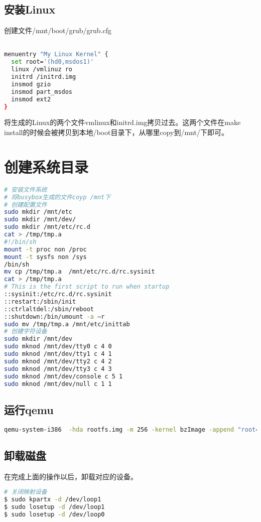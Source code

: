\documentclass[b5paper,9pt,twoside,openany]{article}
\begin{document}
\subsection{安装Linux}
创建文件/mnt/boot/grub/grub.cfg
\begin{lstlisting}[language=bash]

menuentry "My Linux Kernel" {
  set root='(hd0,msdos1)'
  linux /vmlinuz ro
  initrd /initrd.img
  insmod gzio
  insmod part_msdos
  insmod ext2
}
\end{lstlisting}

将生成的Linux的两个文件vmlinux和initrd.img拷贝过去。这两个文件在make install的时候会被拷贝到本地/boot目录下，从哪里copy到/mnt/下即可。

\section{创建系统目录}
\begin{lstlisting}[language=bash]
# 安装文件系统
# 将busybox生成的文件coyp /mnt下
# 创建配置文件
sudo mkdir /mnt/etc
sudo mkdir /mnt/dev/
sudo mkdir /mnt/etc/rc.d
cat > /tmp/tmp.a
#!/bin/sh
mount -t proc non /proc
mount -t sysfs non /sys
/bin/sh
mv cp /tmp/tmp.a  /mnt/etc/rc.d/rc.sysinit
cat > /tmp/tmp.a
# This is the first script to run when startup
::sysinit:/etc/rc.d/rc.sysinit
::restart:/sbin/init
::ctrlaltdel:/sbin/reboot
::shutdown:/bin/umount -a –r
sudo mv /tmp/tmp.a /mnt/etc/inittab
# 创建字符设备
sudo mkdir /mnt/dev
sudo mknod /mnt/dev/tty0 c 4 0
sudo mknod /mnt/dev/tty1 c 4 1
sudo mknod /mnt/dev/tty2 c 4 2
sudo mknod /mnt/dev/tty3 c 4 3
sudo mknod /mnt/dev/console c 5 1
sudo mknod /mnt/dev/null c 1 1
\end{lstlisting}

\subsection{运行qemu}
\begin{lstlisting}[language=bash]
qemu-system-i386  -hda rootfs.img -m 256 -kernel bzImage -append "root=/dev/hda"
\end{lstlisting}

\subsection{卸载磁盘}
在完成上面的操作以后，卸载对应的设备。
\begin{lstlisting}[language=bash]
# 关闭映射设备
$ sudo kpartx -d /dev/loop1
$ sudo losetup -d /dev/loop1
$ sudo losetup -d /dev/loop0
\end{lstlisting}
\end{document}
